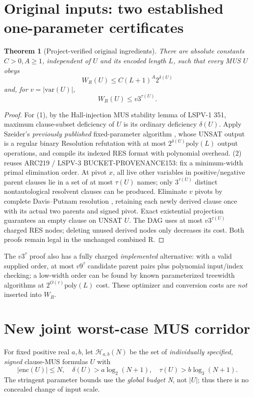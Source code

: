 \documentclass[11pt]{article}
\newtheorem{theorem}{Theorem}
\begin{document}
\section*{Original inputs: two established one-parameter certificates}
\begin{theorem}[Project-verified original ingredients]
There are absolute constants $C>0,A\ge1$, independent of $U$ and its encoded length $L$, such that every MUS $U$ obeys
\[
\boxed{W_R(U)\le C(L+1)^A2^{\delta(U)}}
\tag{1}
\]
and, for $v=|\mathrm{var}(U)|$,
\[
\boxed{W_R(U)\le v3^{\tau(U)}.}
\tag{2}
\]
\end{theorem}
\begin{proof}
For (1), by the Hall-injection MUS stability lemma of LSPV-1 351, maximum clause-subset deficiency of $U$ is its ordinary deficiency $\delta(U)$. Apply Szeider's \emph{previously published} fixed-parameter algorithm \cite{Szeider2004}, whose UNSAT output is a regular binary Resolution refutation with at most $2^{\delta(U)}\mathrm{poly}(L)$ output operations, and compile its indexed RES format with polynomial overhead. (2) reuses ARC219 / LSPV-3 BUCKET-PROVENANCE153: fix a minimum-width primal elimination order. At pivot $x$, all live other variables in positive/negative parent clauses lie in a set of at most $\tau(U)$ names; only $3^{\tau(U)}$ distinct nontautological resolvent clauses can be produced. Eliminate $v$ pivots by complete Davis--Putnam resolution \cite{DavisPutnam1960}, retaining each newly derived clause once with its actual two parents and signed pivot. Exact existential projection guarantees an empty clause on UNSAT $U$. The DAG uses at most $v3^{\tau(U)}$ charged RES nodes; deleting unused derived nodes only decreases its cost. Both proofs remain legal in the unchanged combined R.
\end{proof}
\noindent The $v3^{\tau}$ proof also has a fully charged \emph{implemented} alternative: with a valid supplied order, at most $v9^\tau$ candidate parent pairs plus polynomial input/index checking; a low-width order can be found by known parameterized treewidth algorithms at $2^{O(\tau)}\mathrm{poly}(L)$ cost. These optimizer and conversion costs are \emph{not} inserted into $W_R$.

\section*{New joint worst-case MUS corridor}
For fixed positive real $a,b$, let $\mathcal H_{a,b}(N)$ be the set of \emph{individually specified, signed} clause-MUS formulas $U$ with
\[
|\mathrm{enc}(U)|\le N,\quad
\delta(U)>a\log_2(N+1),\quad
\tau(U)>b\log_3(N+1).
\]
The stringent parameter bounds use the \emph{global budget N}, not $|U|$; thus there is no concealed change of input scale.
\end{document}
